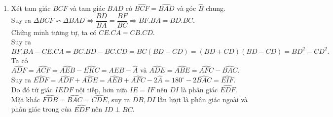\begin{ex}
{\begin{enumerate}
\item Xét tam giác $BCF$ và tam giác $BAD$ có $\widehat{BCF}=\widehat{BAD}$ và góc $\widehat{B}$ chung.\\
Suy ra $\Delta BCF \backsim \Delta BAD \Leftrightarrow \dfrac{BD}{BA}=\dfrac{BF}{BC} \Rightarrow BF.BA=BD.BC$.\\
Chứng minh tương tự, ta có $CE.CA=CB.CD$.\\
Suy ra 
\[BF.BA-CE.CA=BC.BD-BC.CD=BC(BD-CD)=(BD+CD)(BD-CD)=BD^2-CD^2.\]
Ta có \\
$\widehat{ADF}=\widehat{ACF}=\widehat{AEB}-\widehat{EKC}=\widehat{AEB}-\widehat{A}$ và $\widehat{ADE}=\widehat{ABE}=\widehat{AFC}-\widehat{BAC}$.\\
Suy ra $\widehat{EDF}=\widehat{ADF}+\widehat{ADE}=\widehat{AEB}+\widehat{AFC}-2\widehat{A}=180^\circ - 2\widehat{BAC}=\widehat{EIF}$.\\
Do đó tứ giác $IEDF$ nội tiếp, hơn nữa $IE=IF$ nên $DI$ là phân giác $\widehat{EDF}$. \\
Mặt khác $\widehat{FDB}=\widehat{BAC}=\widehat{CDE}$, suy ra $DB, DI$ lần lượt là phân giác ngoài và phân giác trong của $\widehat{EDF}$ nên $ID \perp BC$. 

\end{enumerate}
      }
\end{ex}


